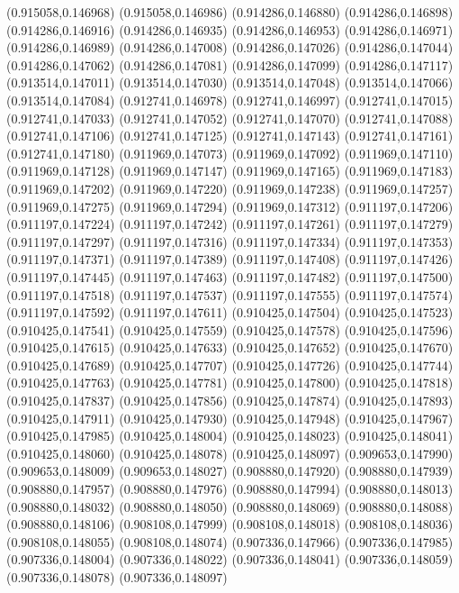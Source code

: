 (0.915058,0.146968)
(0.915058,0.146986)
(0.914286,0.146880)
(0.914286,0.146898)
(0.914286,0.146916)
(0.914286,0.146935)
(0.914286,0.146953)
(0.914286,0.146971)
(0.914286,0.146989)
(0.914286,0.147008)
(0.914286,0.147026)
(0.914286,0.147044)
(0.914286,0.147062)
(0.914286,0.147081)
(0.914286,0.147099)
(0.914286,0.147117)
(0.913514,0.147011)
(0.913514,0.147030)
(0.913514,0.147048)
(0.913514,0.147066)
(0.913514,0.147084)
(0.912741,0.146978)
(0.912741,0.146997)
(0.912741,0.147015)
(0.912741,0.147033)
(0.912741,0.147052)
(0.912741,0.147070)
(0.912741,0.147088)
(0.912741,0.147106)
(0.912741,0.147125)
(0.912741,0.147143)
(0.912741,0.147161)
(0.912741,0.147180)
(0.911969,0.147073)
(0.911969,0.147092)
(0.911969,0.147110)
(0.911969,0.147128)
(0.911969,0.147147)
(0.911969,0.147165)
(0.911969,0.147183)
(0.911969,0.147202)
(0.911969,0.147220)
(0.911969,0.147238)
(0.911969,0.147257)
(0.911969,0.147275)
(0.911969,0.147294)
(0.911969,0.147312)
(0.911197,0.147206)
(0.911197,0.147224)
(0.911197,0.147242)
(0.911197,0.147261)
(0.911197,0.147279)
(0.911197,0.147297)
(0.911197,0.147316)
(0.911197,0.147334)
(0.911197,0.147353)
(0.911197,0.147371)
(0.911197,0.147389)
(0.911197,0.147408)
(0.911197,0.147426)
(0.911197,0.147445)
(0.911197,0.147463)
(0.911197,0.147482)
(0.911197,0.147500)
(0.911197,0.147518)
(0.911197,0.147537)
(0.911197,0.147555)
(0.911197,0.147574)
(0.911197,0.147592)
(0.911197,0.147611)
(0.910425,0.147504)
(0.910425,0.147523)
(0.910425,0.147541)
(0.910425,0.147559)
(0.910425,0.147578)
(0.910425,0.147596)
(0.910425,0.147615)
(0.910425,0.147633)
(0.910425,0.147652)
(0.910425,0.147670)
(0.910425,0.147689)
(0.910425,0.147707)
(0.910425,0.147726)
(0.910425,0.147744)
(0.910425,0.147763)
(0.910425,0.147781)
(0.910425,0.147800)
(0.910425,0.147818)
(0.910425,0.147837)
(0.910425,0.147856)
(0.910425,0.147874)
(0.910425,0.147893)
(0.910425,0.147911)
(0.910425,0.147930)
(0.910425,0.147948)
(0.910425,0.147967)
(0.910425,0.147985)
(0.910425,0.148004)
(0.910425,0.148023)
(0.910425,0.148041)
(0.910425,0.148060)
(0.910425,0.148078)
(0.910425,0.148097)
(0.909653,0.147990)
(0.909653,0.148009)
(0.909653,0.148027)
(0.908880,0.147920)
(0.908880,0.147939)
(0.908880,0.147957)
(0.908880,0.147976)
(0.908880,0.147994)
(0.908880,0.148013)
(0.908880,0.148032)
(0.908880,0.148050)
(0.908880,0.148069)
(0.908880,0.148088)
(0.908880,0.148106)
(0.908108,0.147999)
(0.908108,0.148018)
(0.908108,0.148036)
(0.908108,0.148055)
(0.908108,0.148074)
(0.907336,0.147966)
(0.907336,0.147985)
(0.907336,0.148004)
(0.907336,0.148022)
(0.907336,0.148041)
(0.907336,0.148059)
(0.907336,0.148078)
(0.907336,0.148097)

